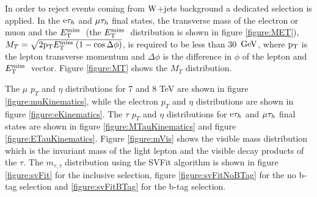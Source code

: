 
In order to reject events coming from $\mathrm{W}$+jets background a dedicated selection is applied. 
In the $\mathrm{e}\mathrm{\tau}_h$ and $\mathrm{\mu}\mathrm{\tau}_h$ final states, the transverse mass of the electron 
or muon and the $E_\mathrm{T}^{\mathrm{miss}}\;$ (the $E_\mathrm{T}^{\mathrm{miss}}\;$ distribution is shown in figure \ref{figure:MET}), 
$M_{T} = \sqrt{2 \mathrm{p_{T}} E_\mathrm{T}^{\mathrm{miss}}\; (1-\cos\Delta\phi)}$, is required to 
be less than 30~$\mathrm{GeV}$, where $\mathrm{p_{T}}$ is the lepton transverse momentum and $\Delta\phi$ is the difference in $\phi$ of the lepton and $E_\mathrm{T}^{\mathrm{miss}}\;$ vector. Figure \ref{figure:MT} shows the $M_{T}$ distribution.

The $\mu$ $p_{T}$ and $\eta$ distributions for 7 and 8 TeV are shown in figure \ref{figure:muKinematics},
while the electron $p_{T}$ and $\eta$ distributions are shown in figure \ref{figure:eKinematics}.
 The $\tau$ $p_{T}$ 
and $\eta$ distributions for $\mathrm{e}\mathrm{\tau}_h$ and $\mathrm{\mu}\mathrm{\tau}_h$ 
final states are shown in figure \ref{figure:MTauKinematics} 
and figure \ref{figure:ETauKinematics}.
Figure \ref{figure:mVis} shows the visible mass distribution 
which is the invariant mass of the light lepton and the visible decay products of the $\tau$.
The $m_{\tau,\tau}$ distribution using the SVFit algorithm is shown in
figure \ref{figure:svFit} for the inclusive selection, figure \ref{figure:svFitNoBTag}
for the no b-tag selection and \ref{figure:svFitBTag} for the b-tag selection.

